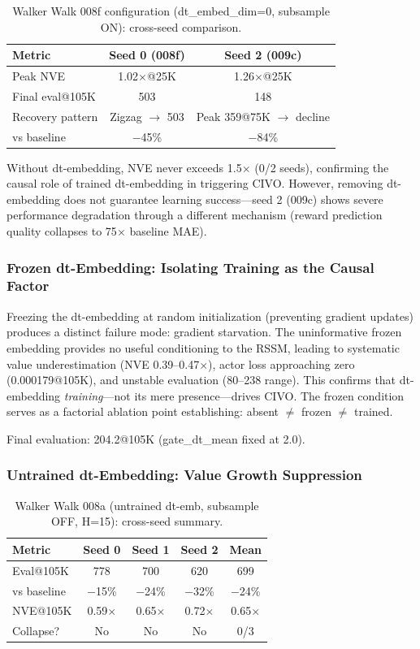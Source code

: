 \documentclass[10pt,letterpaper]{article}
\begin{document}
\begin{table}[h]
\centering
\caption{Walker Walk 008f configuration (dt\_embed\_dim=0, subsample ON): cross-seed comparison.}
\label{tab:008f_crossseed}
\begin{tabular}{lcc}
\toprule
Metric & Seed 0 (008f) & Seed 2 (009c) \\
\midrule
Peak NVE & 1.02$\times$@25K & 1.26$\times$@25K \\
Final eval@105K & 503 & 148 \\
Recovery pattern & Zigzag $\rightarrow$ 503 & Peak 359@75K $\rightarrow$ decline \\
vs baseline & $-$45\% & $-$84\% \\
\bottomrule
\end{tabular}
\end{table}

Without dt-embedding, NVE never exceeds 1.5$\times$ (0/2 seeds), confirming the causal role of trained dt-embedding in triggering CIVO. However, removing dt-embedding does not guarantee learning success---seed 2 (009c) shows severe performance degradation through a different mechanism (reward prediction quality collapses to 75$\times$ baseline MAE).

\subsubsection{Frozen dt-Embedding: Isolating Training as the Causal Factor}

Freezing the dt-embedding at random initialization (preventing gradient updates) produces a distinct failure mode: gradient starvation. The uninformative frozen embedding provides no useful conditioning to the RSSM, leading to systematic value underestimation (NVE 0.39--0.47$\times$), actor loss approaching zero (0.000179@105K), and unstable evaluation (80--238 range). This confirms that dt-embedding \emph{training}---not its mere presence---drives CIVO. The frozen condition serves as a factorial ablation point establishing: absent $\neq$ frozen $\neq$ trained.

Final evaluation: 204.2@105K (gate\_dt\_mean fixed at 2.0).

\subsubsection{Untrained dt-Embedding: Value Growth Suppression}

\begin{table}[h]
\centering
\caption{Walker Walk 008a (untrained dt-emb, subsample OFF, H=15): cross-seed summary.}
\label{tab:008a_crossseed}
\begin{tabular}{lcccc}
\toprule
Metric & Seed 0 & Seed 1 & Seed 2 & Mean \\
\midrule
Eval@105K & 778 & 700 & 620 & 699 \\
vs baseline & $-$15\% & $-$24\% & $-$32\% & $-$24\% \\
NVE@105K & 0.59$\times$ & 0.65$\times$ & 0.72$\times$ & 0.65$\times$ \\
Collapse? & No & No & No & 0/3 \\
\bottomrule
\end{tabular}
\end{table}
\end{document}
